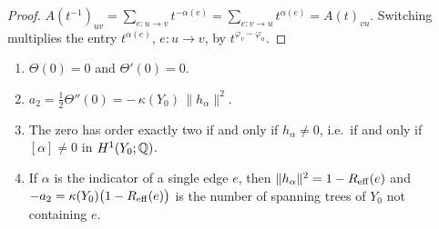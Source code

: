 \begin{proof}
$A(t^{-1})_{uv}=\sum_{e\colon u\to v}t^{-\alpha(e)}=\sum_{e\colon v\to u}t^{\alpha(e)}
=A(t)_{vu}$. Switching multiplies the entry $t^{\alpha(e)}$, $e\colon u\to v$, by
$t^{\varphi_v-\varphi_u}$.
\end{proof}

\begin{theorem}\label{IX:thm:zero}
\begin{enumerate}
\item[(i)] $\Theta(0)=0$ and $\Theta'(0)=0$.
\item[(ii)] $a_2=\tfrac12\Theta''(0)=-\,\kappa(Y_0)\,\|h_\alpha\|^{2}$.
\item[(iii)] The zero has order exactly two if and only if $h_\alpha\neq0$, i.e.\ if and
only if $[\alpha]\neq0$ in $H^{1}(Y_0;\mathbb{Q})$.
\item[(iv)] If $\alpha$ is the indicator of a single edge $e$, then
$\|h_\alpha\|^{2}=1-R_{\mathrm{eff}}(e)$ and $-a_2=\kappa(Y_0)\bigl(1-R_{\mathrm{eff}}(e)\bigr)$ is the number
of spanning trees of $Y_0$ not containing $e$.
\end{enumerate}
\end{theorem}

